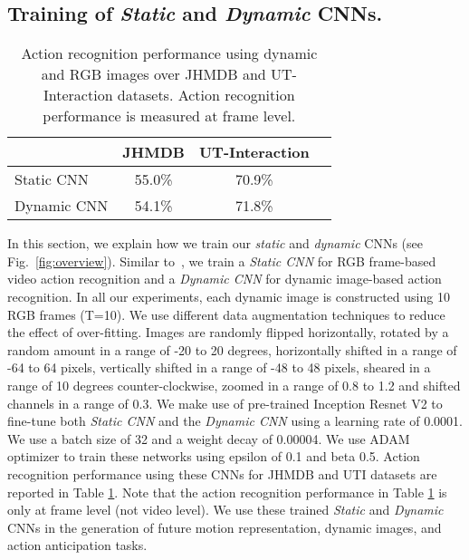 
\subsection{Training of {\em Static} and {\em Dynamic} CNNs.}
\label{sec.exp.action}
\begin{table}[t]
  \centering
  \begin{tabular}{lc@{\hskip 0.1in}cc}
  \hline
  & \textbf{JHMDB} & \textbf{UT-Interaction} \\ \hline%
Static CNN & 55.0\% & 70.9\%  \\%
Dynamic CNN & 54.1\% & 71.8\% \\%
\hline
  \end{tabular}
  \caption{Action recognition performance using dynamic and RGB images over JHMDB and UT-Interaction datasets. Action recognition performance is measured at frame level.}
  \label{tab:compl}
\end{table}
In this section, we explain how we train our \emph{static} and \emph{dynamic} CNNs (see Fig.~\ref{fig:overview}).
Similar to~\cite{bilen2016dynamic,Bilen2017}, we train a \emph{Static CNN} for RGB frame-based video action recognition and a \emph{Dynamic CNN} for dynamic image-based action recognition. In all our experiments, each dynamic image is constructed using 10 RGB frames (T=10). We use different data augmentation techniques to reduce the effect of over-fitting. Images are randomly flipped horizontally, rotated by a random amount in a range of -20 to 20 degrees, horizontally shifted in a range of -64 to 64 pixels, vertically shifted in a range of -48 to 48 pixels, sheared in a range of 10 degrees counter-clockwise, zoomed in a range of 0.8 to 1.2 and shifted channels in a range of 0.3. We make use of pre-trained Inception Resnet V2 \cite{szegedy2017inception} to fine-tune both \emph{Static CNN} and the \emph{Dynamic CNN} using a learning rate of 0.0001. We use a batch size of 32 and a weight decay of 0.00004. We use ADAM \cite{kingma2015adam} optimizer to train these networks using epsilon of 0.1 and beta 0.5.
Action recognition performance using these CNNs for JHMDB and UTI datasets are reported in Table \ref{tab:compl}. Note that the action recognition performance in Table \ref{tab:compl} is only at frame level (not video level).
% 
We use these trained {\em Static} and {\em Dynamic} CNNs in the generation of future motion representation, dynamic images, and action anticipation tasks.


